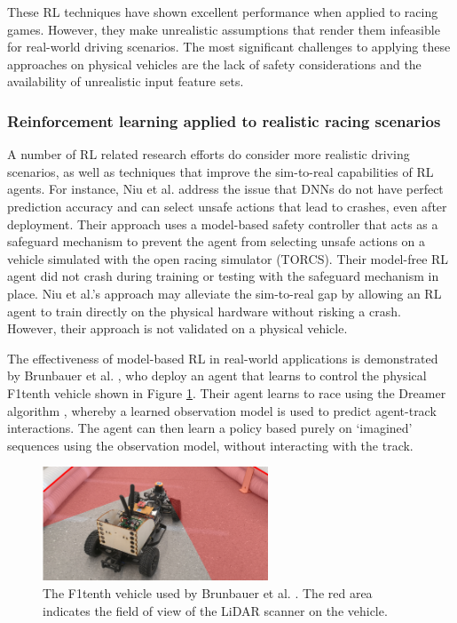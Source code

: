 These RL techniques have shown excellent performance when applied to racing games. 
However, they make unrealistic assumptions that render them infeasible for real-world driving scenarios.
The most significant challenges to applying these approaches on physical vehicles are the lack of safety considerations and the availability of unrealistic input feature sets.


\subsubsection*{Reinforcement learning applied to realistic racing scenarios}

A number of RL related research efforts do consider more realistic driving scenarios, as well as techniques that improve the sim-to-real capabilities of RL agents.
For instance, Niu et al. \cite{Niu2020} address the issue that DNNs do not have perfect prediction accuracy and can select unsafe actions that lead to crashes, even after deployment.
Their approach uses a model-based safety controller that acts as a safeguard mechanism to prevent the agent from selecting unsafe actions on a vehicle simulated with the open racing simulator (TORCS).
Their model-free RL agent did not crash during training or testing with the safeguard mechanism in place.
Niu et al.'s \cite{Niu2020} approach may alleviate the sim-to-real gap by allowing an RL agent to train directly on the physical hardware without risking a crash. 
However, their approach is not validated on a physical vehicle.

The effectiveness of model-based RL in real-world applications is demonstrated by Brunbauer et al. \cite{brunnbauer2021}, who deploy an agent that learns to control the physical F1tenth vehicle shown in Figure \ref{fig:brunbauer}.
Their agent learns to race using the Dreamer algorithm \cite{Hafner2019a}, whereby a learned observation model is used to predict agent-track interactions.
The agent can then learn a policy based purely on `imagined' sequences using the observation model, without interacting with the track.

\begin{figure}[htb!]
    \centering
    \includegraphics[width=0.6\textwidth]{contents/chapt2/figs/brunnbauer.PNG}
    \caption[The F1tenth vehicle used by Brunbauer]{The F1tenth vehicle used by Brunbauer et al. \cite{brunnbauer2021}. The red area indicates the field of view of the LiDAR scanner on the vehicle.}
    \label{fig:brunbauer}
\end{figure}

